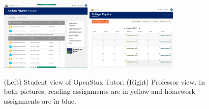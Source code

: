 \documentclass[../../../main.tex]{subfiles}
\begin{document}
\begin{figure}
\centering
\includegraphics[width=0.4\textwidth]{figures/openstax1.png}
\includegraphics[width=0.4\textwidth]{figures/openstax2.png}
\caption{\label{fig:openstax} (Left) Student view of OpenStax Tutor.  (Right) Professor view.  In both pictures, reading assignments are in yellow and homework assignments are in blue.}
\end{figure}
\end{document}
